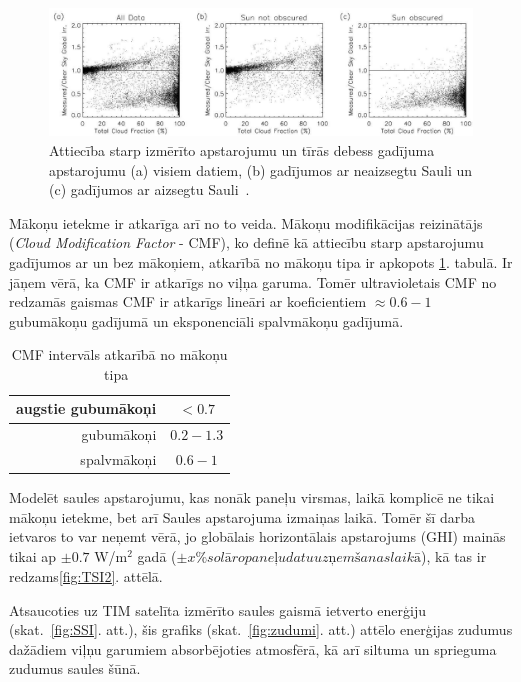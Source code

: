 \begin{figure}[h]
	\centering
	\includegraphics[width=\linewidth]{figures/misc/makoni_ietekme.jpg}
	\caption{Attiecība starp izmērīto apstarojumu un tīrās debess gadījuma apstarojumu (a) visiem datiem, (b) gadījumos ar neaizsegtu Sauli un (c) gadījumos ar aizsegtu Sauli~\cite{CloudCoverageImpactOnIrradiance}.}
	\label{fig:makoni_ietekme}
\end{figure}

Mākoņu ietekme ir atkarīga arī no to veida. Mākoņu modifikācijas reizinātājs (\textit{Cloud Modification Factor} - CMF), ko definē kā attiecību starp apstarojumu gadījumos ar un bez mākoņiem, atkarībā no mākoņu tipa ir apkopots \ref{tab:CMF}. tabulā. Ir jāņem vērā, ka CMF ir atkarīgs no viļņa garuma. Tomēr ultravioletais CMF no redzamās gaismas CMF ir atkarīgs lineāri ar koeficientiem $\approx0.6-1$ gubumākoņu gadījumā un eksponenciāli spalvmākoņu gadījumā.
\begin{table}[h]
	\caption{CMF intervāls atkarībā no mākoņu tipa~\cite{effectCloudsOnSurface}}
	\begin{center}
		\begin{tabular}{| r | c |}
			\hline
			augstie gubumākoņi & $<0.7$     \\ \hline
			gubumākoņi         & $0.2-1.3$ \\ \hline
			spalvmākoņi        & $0.6-1$    \\ \hline
		\end{tabular}
	\end{center}
	\label{tab:CMF}
\end{table}

Modelēt saules apstarojumu, kas nonāk paneļu virsmas, laikā komplicē ne tikai mākoņu ietekme, bet arī Saules apstarojuma izmaiņas laikā. Tomēr šī darba ietvaros to var neņemt vērā, jo globālais horizontālais apstarojums (GHI) mainās tikai ap $\pm 0.7$ W/m$^2$ gadā ($\pm x \% solāro paneļu datu uzņemšanas laikā$), kā tas ir redzams\ref{fig:TSI2}. attēlā.

Atsaucoties uz TIM satelīta izmērīto saules gaismā ietverto enerģiju (skat.~\ref{fig:SSI}. att.), šis grafiks (skat.~\ref{fig:zudumi}. att.) attēlo enerģijas zudumus dažādiem viļņu garumiem absorbējoties atmosfērā, kā arī siltuma un sprieguma zudumus saules šūnā.

